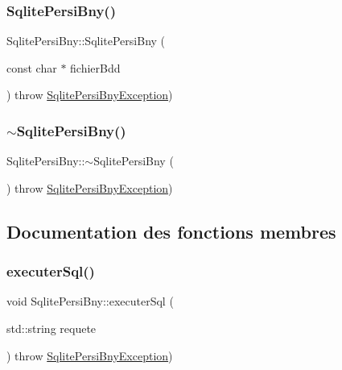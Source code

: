 \subsubsection{\texorpdfstring{Sqlite\+Persi\+Bny()}{SqlitePersiBny()}}
{\footnotesize\ttfamily Sqlite\+Persi\+Bny\+::\+Sqlite\+Persi\+Bny (\begin{DoxyParamCaption}\item[{const char $\ast$}]{fichier\+Bdd }\end{DoxyParamCaption}) throw  \hyperlink{classSqlitePersiBnyException}{Sqlite\+Persi\+Bny\+Exception}) }

\mbox{\label{classSqlitePersiBny_a20a424146469e8d6ca9347c660d1027c}} 
\subsubsection{\texorpdfstring{$\sim$\+Sqlite\+Persi\+Bny()}{~SqlitePersiBny()}}
{\footnotesize\ttfamily Sqlite\+Persi\+Bny\+::$\sim$\+Sqlite\+Persi\+Bny (\begin{DoxyParamCaption}{ }\end{DoxyParamCaption}) throw  \hyperlink{classSqlitePersiBnyException}{Sqlite\+Persi\+Bny\+Exception}) \hspace{0.3cm}{\ttfamily [virtual]}}



\subsection{Documentation des fonctions membres}
\mbox{\label{classSqlitePersiBny_aa018371d06ba831126a6c4fdc77b741f}} 
\subsubsection{\texorpdfstring{executer\+Sql()}{executerSql()}\hspace{0.1cm}{\footnotesize\ttfamily [1/2]}}
{\footnotesize\ttfamily void Sqlite\+Persi\+Bny\+::executer\+Sql (\begin{DoxyParamCaption}\item[{std\+::string}]{requete }\end{DoxyParamCaption}) throw  \hyperlink{classSqlitePersiBnyException}{Sqlite\+Persi\+Bny\+Exception}) }

